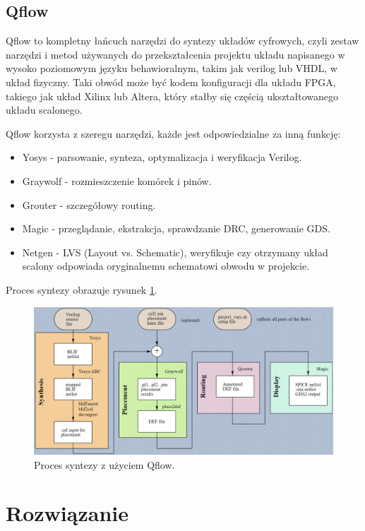 \documentclass[12pt,oneside,reqno]{article}
\begin{document}
\subsection{Qflow}
Qflow to kompletny łańcuch narzędzi do syntezy układów cyfrowych, czyli zestaw narzędzi i metod używanych do przekształcenia projektu układu napisanego w wysoko poziomowym języku behawioralnym, takim jak verilog lub VHDL, w układ fizyczny. Taki obwód może być kodem konfiguracji dla układu FPGA, takiego jak układ Xilinx lub Altera, który stałby się częścią ukształtowanego układu scalonego. \cite{qflow}

Qflow korzysta z szeregu narzędzi, każde jest odpowiedzialne za inną funkcję:
\begin{itemize}
    \item Yosys - parsowanie, synteza, optymalizacja i weryfikacja Verilog.
    \item Graywolf - rozmieszczenie komórek i pinów.
    \item Grouter - szczegółowy routing.
    \item Magic - przeglądanie, ekstrakcja, sprawdzanie DRC, generowanie GDS.
    \item Netgen - LVS (Layout vs. Schematic), weryfikuje czy otrzymany układ scalony odpowiada oryginalnemu schematowi obwodu w projekcie.
\end{itemize}
Proces syntezy obrazuje rysunek \ref{fig:synthesis}.
\begin{figure}[H]
\centering
\includegraphics[width=\linewidth]{images/qflowsyn.jpg}
\caption{Proces syntezy z użyciem Qflow. \cite{opencircuitdesign-qflow}}\label{fig:synthesis}
\end{figure}

\clearpage
\section{Rozwiązanie}
\end{document}
